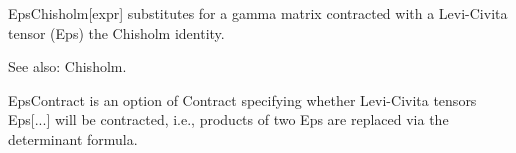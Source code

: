 








EpsChisholm[expr] substitutes for a gamma matrix contracted with a Levi-Civita tensor (Eps) the Chisholm identity.

See also:  Chisholm.








EpsContract is an option of Contract specifying whether Levi-Civita tensors Eps[...] will be contracted, i.e., products of two { }Eps are
  replaced via the determinant formula.

